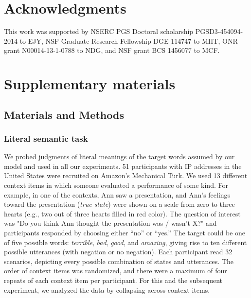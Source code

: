 \documentclass[12pt]{article}
\newcommand{\ejy}[1]{\textcolor{Red}{[ejy: #1]}}
\begin{document}









\section*{Acknowledgments}
This work was supported by NSERC PGS Doctoral scholarship PGSD3-454094-2014 to EJY, NSF Graduate Research Fellowship DGE-114747 to MHT, ONR grant N00014-13-1-0788 to NDG, and NSF grant BCS 1456077 to MCF.


\section*{Supplementary materials}


\subsection*{Materials and Methods}

\subsubsection*{Literal semantic task}

We probed judgments of literal meanings of the target words assumed by our model and used in all our experiments. 
51 participants with IP addresses in the United States were recruited on Amazon's Mechanical Turk. 
We used 13 different context items in which someone evaluated a performance of some kind. 
For example, in one of the contexts, Ann saw a presentation, and Ann's feelings toward the presentation (\emph{true state}) were shown on a scale from zero to three hearts 
(e.g., two out of three hearts filled in red color). 
The question of interest was "Do you think Ann thought the presentation was / wasn't X?" and participants responded by choosing either \enquote{no} or \enquote{yes.}  
The target could be one of five possible words: \emph{terrible}, \emph{bad}, \emph{good}, and \emph{amazing}, giving rise to ten different possible utterances (with negation or no negation). 
Each participant read 32 scenarios, depicting every possible combination of states and utterances. 
The order of context items was randomized, and there were a maximum of four repeats of each context item per participant. 
For this and the subsequent experiment, we analyzed the data by collapsing across context items. 
\end{document}
